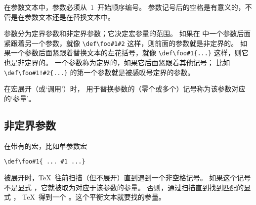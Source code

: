 \documentclass{book}
\begin{document}
在参数文本中，参数必须从~1~开始顺序编号。
参数记号后的空格是有意义的，不管是在参数文本还是在替换文本中。

参数分为定界参数和非定界参数；它决定宏参量的范围。
如果在  中一个参数后面紧跟着另一个参数，就像
\verb+\def\foo#1#2+ 这样，则前面的参数就是非定界的。
如果一个参数后面紧跟着替换文本的左花括号，就像
\verb+\def\foo#1{...}+ 这样，则它也是非定界的。
一个参数称为定界的，如果它后面紧跟着其他记号；
比如 \verb+\def\foo#1!#2{...}+ 的第一个参数就是被感叹号定界的参数。

在宏展开（或`调用'）时，
用于替换参数的（零个或多个）记号称为该参数对应的`参量'。

\subsection{非定界参数}

在带有的宏，比如单参数宏 
\begin{verbatim}
\def\foo#1{ ... #1 ...}
\end{verbatim}
被展开时，\TeX\ 往前扫描（但不展开）直到遇到一个非空格记号。
如果这个记号不是显式 ，它就被取为对应于该参数的参量。
否则，通过扫描直到找到匹配的显式 ，
\TeX\ 得到一个 。这个平衡文本就要找的参量。
\end{document}

